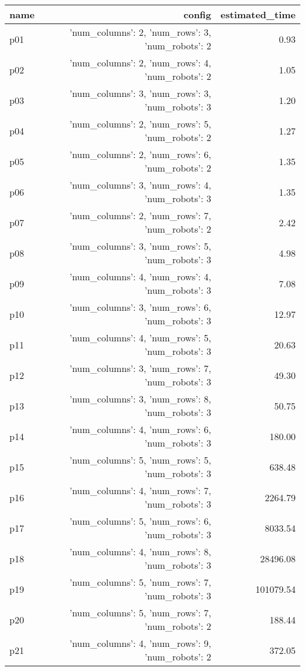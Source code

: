 \documentclass{article}
\begin{document}
                            \begin{center}
                            \scriptsize
                            \begin{tabular}{@{}l|r|r@{}}
                            name & config & estimated\_time\\\midrule
                              p01&{'num\_columns': 2, 'num\_rows': 3, 'num\_robots': 2}&0.93\\
  p02&{'num\_columns': 2, 'num\_rows': 4, 'num\_robots': 2}&1.05\\
  p03&{'num\_columns': 3, 'num\_rows': 3, 'num\_robots': 3}&1.20\\
  p04&{'num\_columns': 2, 'num\_rows': 5, 'num\_robots': 2}&1.27\\
  p05&{'num\_columns': 2, 'num\_rows': 6, 'num\_robots': 2}&1.35\\
  p06&{'num\_columns': 3, 'num\_rows': 4, 'num\_robots': 3}&1.35\\
  p07&{'num\_columns': 2, 'num\_rows': 7, 'num\_robots': 2}&2.42\\
  p08&{'num\_columns': 3, 'num\_rows': 5, 'num\_robots': 3}&4.98\\
  p09&{'num\_columns': 4, 'num\_rows': 4, 'num\_robots': 3}&7.08\\
  p10&{'num\_columns': 3, 'num\_rows': 6, 'num\_robots': 3}&12.97\\
  p11&{'num\_columns': 4, 'num\_rows': 5, 'num\_robots': 3}&20.63\\
  p12&{'num\_columns': 3, 'num\_rows': 7, 'num\_robots': 3}&49.30\\
  p13&{'num\_columns': 3, 'num\_rows': 8, 'num\_robots': 3}&50.75\\
  p14&{'num\_columns': 4, 'num\_rows': 6, 'num\_robots': 3}&180.00\\
  p15&{'num\_columns': 5, 'num\_rows': 5, 'num\_robots': 3}&638.48\\
  p16&{'num\_columns': 4, 'num\_rows': 7, 'num\_robots': 3}&2264.79\\
  p17&{'num\_columns': 5, 'num\_rows': 6, 'num\_robots': 3}&8033.54\\
  p18&{'num\_columns': 4, 'num\_rows': 8, 'num\_robots': 3}&28496.08\\
  p19&{'num\_columns': 5, 'num\_rows': 7, 'num\_robots': 3}&101079.54\\
  p20&{'num\_columns': 5, 'num\_rows': 7, 'num\_robots': 2}&188.44\\
  p21&{'num\_columns': 4, 'num\_rows': 9, 'num\_robots': 2}&372.05\\

\end{tabular}
\end{center}
\end{document}
